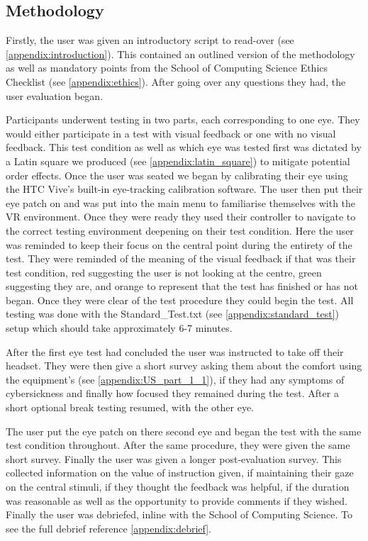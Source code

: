 \documentclass{l4proj}
\begin{document}
\subsection{Methodology}
Firstly, the user was given an introductory script to read-over (see \ref{appendix:introduction}). This contained an outlined version of the methodology as well as mandatory points from the School of Computing Science Ethics Checklist (see \ref{appendix:ethics}). After going over any questions they had, the user evaluation began.

Participants underwent testing in two parts, each corresponding to one eye. They would either participate in a test with visual feedback or one with no visual feedback. This test condition as well as which eye was tested first was dictated by a Latin square we produced (see \ref{appendix:latin_square}) to mitigate potential order effects. Once the user was seated we began by calibrating their eye using the HTC Vive's built-in eye-tracking calibration software. The user then put their eye patch on and was put into the main menu to familiarise themselves with the VR environment. Once they were ready they used their controller to navigate to the correct testing environment deepening on their test condition. Here the user was reminded to keep their focus on the central point during the entirety of the test. They were reminded of the meaning of the visual feedback if that was their test condition, red suggesting the user is not looking at the centre, green suggesting they are, and orange to represent that the test has finished or has not began. Once they were clear of the test procedure they could begin the test. All testing was done with the Standard\_Test.txt (see \ref{appendix:standard_test}) setup which should take approximately 6-7 minutes. 

After the first eye test had concluded the user was instructed to take off their headset. They were then give a short survey asking them about the comfort using the equipment's (see \ref{appendix:US_part_1_1}), if they had any symptoms of cybersickness and finally how focused they remained during the test. After a short optional break testing resumed, with the other eye.

The user put the eye patch on there second eye and began the test with the same test condition throughout. After the same procedure, they were given the same short survey. Finally the user was given a longer post-evaluation survey. This collected information on the value of instruction given, if maintaining their gaze on the central stimuli, if they thought the feedback was helpful, if the duration was reasonable as well as the opportunity to provide comments if they wished. Finally the user was debriefed, inline with the School of Computing Science. To see the full debrief reference \ref{appendix:debrief}.
\end{document}
